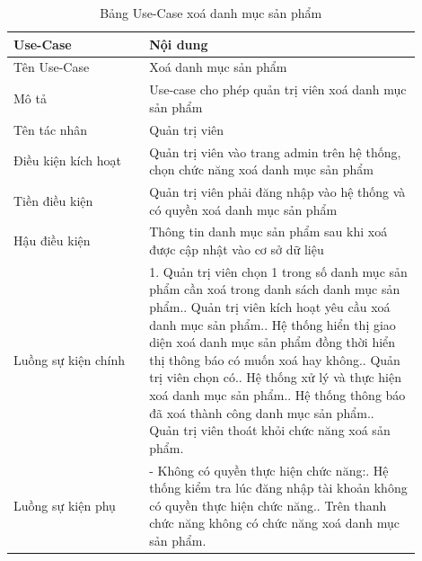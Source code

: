 \newpage
\begin{longtable}[htp]{ |m{0.3\linewidth}|m{0.6\linewidth}|}
 \caption{Bảng Use-Case xoá danh mục sản phẩm \label{long}}\\
 \hline
 Use-Case & Nội dung \\
 \hline
 Tên Use-Case & Xoá danh mục sản phẩm \\
 \hline
 Mô tả & Use-case cho phép quản trị viên xoá danh mục sản phẩm\\
 \hline
 Tên tác nhân & Quản trị viên\\
 \hline
 Điều kiện kích hoạt & Quản trị viên vào trang admin trên hệ thống, chọn chức năng xoá danh mục sản phẩm\\
 \hline
 Tiền điều kiện & Quản trị viên phải đăng nhập vào hệ thống và có quyền xoá danh mục sản phẩm\\
 \hline
 Hậu điều kiện & Thông tin danh mục sản phẩm sau khi xoá được cập nhật vào cơ sở dữ liệu\\
 \hline
 Luồng sự kiện chính & 
 1. Quản trị viên chọn 1 trong số danh mục sản phẩm cần xoá trong danh sách danh mục sản phẩm.\newline
 2. Quản trị viên kích hoạt yêu cầu xoá danh mục sản phẩm.\newline
 3. Hệ thống hiển thị giao diện xoá danh mục sản phẩm đồng thời hiển thị thông báo có muốn xoá hay không.\newline
 4. Quản trị viên chọn có.\newline
 5. Hệ thống xử lý và thực hiện xoá danh mục sản phẩm.\newline
 6. Hệ thống thông báo đã xoá thành công danh mục sản phẩm.\newline	
 7. Quản trị viên thoát khỏi chức năng xoá sản phẩm.
 \\
 \hline
 Luồng sự kiện phụ & 
  - Không có quyền thực hiện chức năng:\newline
  1. Hệ thống kiểm tra lúc đăng nhập tài khoản không có quyền thực hiện chức năng.\newline
  2. Trên thanh chức năng không có chức năng xoá danh mục sản phẩm.
 \\
 \hline
\end{longtable}


